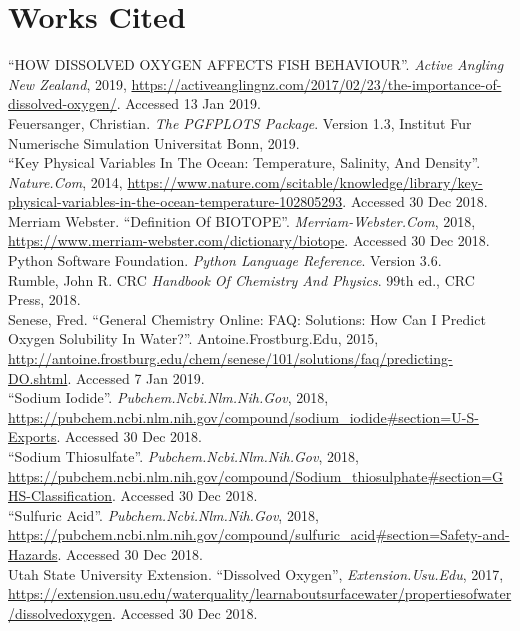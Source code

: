 \documentclass[a4paper]{article}
\begin{document}
\section*{Works Cited}
\begin{hangparas}{.25in}{1}
  \begin{sloppypar}
    ``HOW DISSOLVED OXYGEN AFFECTS FISH BEHAVIOUR''. \textit{Active Angling New
    Zealand}, 2019,
    \url{https://activeanglingnz.com/2017/02/23/the-importance-of-dissolved-oxygen/}.
    Accessed 13 Jan 2019. \\

    Feuersanger, Christian. \textit{The PGFPLOTS Package}. Version 1.3,
    Institut Fur Numerische Simulation Universitat Bonn, 2019. \\

    ``Key Physical Variables In The Ocean: Temperature, Salinity, And
    Density''.  \textit{Nature.Com}, 2014,
    \url{https://www.nature.com/scitable/knowledge/library/key-physical-variables-in-the-ocean-temperature-102805293}.
    Accessed 30 Dec 2018. \\

    Merriam Webster. ``Definition Of BIOTOPE''. \textit{Merriam-Webster.Com},
    2018, \url{https://www.merriam-webster.com/dictionary/biotope}. Accessed 30
    Dec 2018. \\

    Python Software Foundation. \textit{Python Language Reference}. Version
    3.6.  \\

    Rumble, John R. CRC \textit{Handbook Of Chemistry And Physics}. 99th ed.,
    CRC Press, 2018. \\

    Senese, Fred. ``General Chemistry Online: FAQ: Solutions: How Can I Predict
    Oxygen Solubility In Water?''. Antoine.Frostburg.Edu, 2015,
    \url{http://antoine.frostburg.edu/chem/senese/101/solutions/faq/predicting-DO.shtml}.
    Accessed 7 Jan 2019. \\

    ``Sodium Iodide''. \textit{Pubchem.Ncbi.Nlm.Nih.Gov}, 2018,
    \url{https://pubchem.ncbi.nlm.nih.gov/compound/sodium_iodide#section=U-S-Exports}.
    Accessed 30 Dec 2018. \\

    ``Sodium Thiosulfate''. \textit{Pubchem.Ncbi.Nlm.Nih.Gov}, 2018,
    \url{https://pubchem.ncbi.nlm.nih.gov/compound/Sodium_thiosulphate#section=GHS-Classification}.
    Accessed 30 Dec 2018. \\

    ``Sulfuric Acid''. \textit{Pubchem.Ncbi.Nlm.Nih.Gov}, 2018,
    \url{https://pubchem.ncbi.nlm.nih.gov/compound/sulfuric_acid#section=Safety-and-Hazards}.
    Accessed 30 Dec 2018. \\

    Utah State University Extension. ``Dissolved Oxygen'',
    \textit{Extension.Usu.Edu}, 2017,
    \url{https://extension.usu.edu/waterquality/learnaboutsurfacewater/propertiesofwater/dissolvedoxygen}.
    Accessed 30 Dec 2018. \\
  \end{sloppypar}
\end{hangparas}
\end{document}
